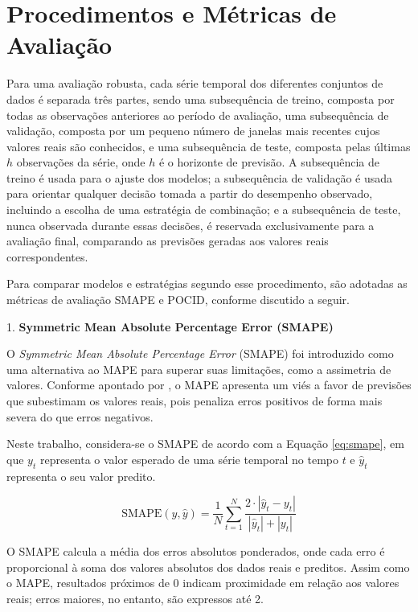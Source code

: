 \section{Procedimentos e Métricas de Avaliação} \label{sec:metricas}

Para uma avaliação robusta, cada série temporal dos diferentes conjuntos de dados é separada três partes, sendo uma subsequência de treino, composta por todas as observações anteriores ao período de avaliação, uma subsequência de validação, composta por um pequeno número de janelas mais recentes cujos valores reais são conhecidos, e uma subsequência de teste, composta pelas últimas $h$ observações da série, onde $h$ é o horizonte de previsão. A subsequência de treino é usada para o ajuste dos modelos; a subsequência de validação é usada para orientar qualquer decisão tomada a partir do desempenho observado, incluindo a escolha de uma estratégia de combinação; e a subsequência de teste, nunca observada durante essas decisões, é reservada exclusivamente para a avaliação final, comparando as previsões geradas aos valores reais correspondentes.

Para comparar modelos e estratégias segundo esse procedimento, são adotadas as métricas de avaliação SMAPE e POCID, conforme discutido a seguir.


1. \textbf{Symmetric Mean Absolute Percentage Error (SMAPE)}

O \textit{Symmetric Mean Absolute Percentage Error} (SMAPE) foi introduzido como uma alternativa ao MAPE para superar suas limitações, como a assimetria de valores. Conforme apontado por \cite{armstrong1992}, o MAPE apresenta um viés a favor de previsões que subestimam os valores reais, pois penaliza erros positivos de forma mais severa do que erros negativos.

Neste trabalho, considera-se o SMAPE de acordo com a Equação \ref{eq:smape}, em que $y_t$ representa o valor esperado de uma série temporal no tempo $t$ e $\hat{y}_t$ representa o seu valor predito.

\begin{equation}
\text{SMAPE}(y, \hat{y}) = \frac{1}{N} \sum_{t=1}^{N} \frac{2 \cdot | \hat{y}_t - y_t |}{|\hat{y}_t| + |y_t|}
\label{eq:smape}
\end{equation}

O SMAPE calcula a média dos erros absolutos ponderados, onde cada erro é proporcional à soma dos valores absolutos dos dados reais e preditos. Assim como o MAPE, resultados próximos de 0 indicam proximidade em relação aos valores reais; erros maiores, no entanto, são expressos até 2.

